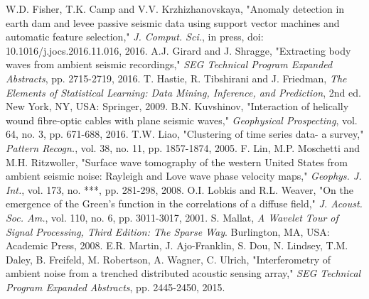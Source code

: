 \documentclass[11pt]{article}
\begin{document}
\begin{thebibliography}{30}
 W.D. Fisher, T.K. Camp and V.V. Krzhizhanovskaya, "Anomaly detection in earth dam and levee passive seismic data using support vector machines and automatic feature selection," \textit{J. Comput. Sci.}, in press, doi: 10.1016/j.jocs.2016.11.016, 2016.
\vspace{-0.2cm}
 A.J. Girard and J. Shragge, "Extracting body waves from ambient seismic recordings," \textit{SEG Technical Program Expanded Abstracts}, pp. 2715-2719, 2016.
\vspace{-0.2cm}
 T. Hastie, R. Tibshirani and J. Friedman, \textit{The Elements of Statistical Learning: Data Mining, Inference, and Prediction}, 2nd ed. New York, NY, USA: Springer, 2009.
\vspace{-0.2cm}
 B.N. Kuvshinov, "Interaction of helically wound fibre-optic cables with plane seismic waves," \textit{Geophysical Prospecting}, vol. 64, no. 3, pp. 671-688, 2016.
\vspace{-0.2cm}
 T.W. Liao, "Clustering of time series data- a survey," \textit{Pattern Recogn.}, vol. 38, no. 11, pp. 1857-1874, 2005.
\vspace{-0.2cm}
 F. Lin, M.P. Moschetti and M.H. Ritzwoller, "Surface wave tomography of the western United States from ambient seismic noise: Rayleigh and Love wave phase velocity maps," \textit{Geophys. J. Int.}, vol. 173, no. ***, pp. 281-298, 2008.
\vspace{-0.2cm}
 O.I. Lobkis and R.L. Weaver, "On the emergence of the Green's function in the correlations of a diffuse field," \textit{J. Acoust. Soc. Am.}, vol. 110, no. 6, pp. 3011-3017, 2001.
\vspace{-0.2cm}
 S. Mallat, \textit{A Wavelet Tour of Signal Processing, Third Edition: The Sparse Way}. Burlington, MA, USA: Academic Press, 2008.
\vspace{-0.2cm}
 E.R. Martin, J. Ajo-Franklin, S. Dou, N. Lindsey, T.M. Daley, B. Freifeld, M. Robertson, A. Wagner, C. Ulrich, "Interferometry of ambient noise from a trenched distributed acoustic sensing array," \textit{SEG Technical Program Expanded Abstracts}, pp. 2445-2450, 2015.

\end{thebibliography}
\end{document}
